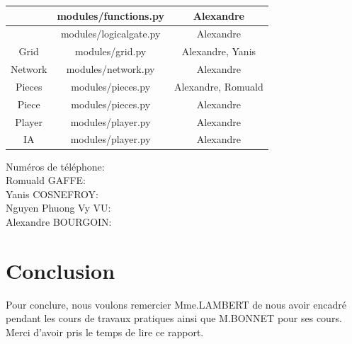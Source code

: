 \documentclass[a4paper]{report}
\begin{document}
\begin{center}
\begin{tabular}{|c|c|c|}
&	      					modules/functions.py&      	Alexandre\\\hline
&      						modules/logicalgate.py&     Alexandre\\\hline
Grid&      					modules/grid.py&      		Alexandre, Yanis\\\hline
Network&      				modules/network.py&      	Alexandre\\\hline
Pieces&      				modules/pieces.py&      	Alexandre, Romuald\\\hline
Piece&      				modules/pieces.py&      	Alexandre\\\hline
Player&      				modules/player.py&      	Alexandre\\\hline
IA&      					modules/player.py&      	Alexandre\\\hline
\end{tabular}\end{center}

Numéros de téléphone: \\
Romuald GAFFE: \\
Yanis COSNEFROY:\\
Nguyen Phuong Vy VU:\\
Alexandre BOURGOIN: \


\part{Conclusion}
Pour conclure, nous voulons remercier Mme.LAMBERT de nous avoir encadré pendant les cours de travaux pratiques ainsi que M.BONNET pour ses cours. Merci d'avoir pris le temps de lire ce rapport. \\
\end{document}
